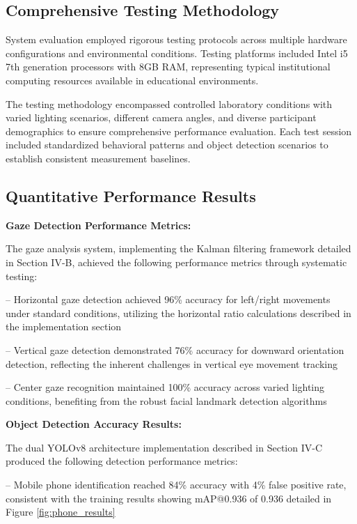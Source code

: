 \documentclass[conference]{IEEEtran}
\begin{document}
\subsection{Comprehensive Testing Methodology}

System evaluation employed rigorous testing protocols across multiple hardware configurations 
and environmental conditions. Testing platforms included Intel i5 7th generation processors 
with 8GB RAM, representing typical institutional computing resources available in educational 
environments.

The testing methodology encompassed controlled laboratory conditions with varied lighting 
scenarios, different camera angles, and diverse participant demographics to ensure 
comprehensive performance evaluation. Each test session included standardized behavioral 
patterns and object detection scenarios to establish consistent measurement baselines.

\subsection{Quantitative Performance Results}

\textbf{Gaze Detection Performance Metrics:}

The gaze analysis system, implementing the Kalman filtering framework detailed in Section IV-B, 
achieved the following performance metrics through systematic testing:

-- Horizontal gaze detection achieved 96\% accuracy for left/right movements under 
standard conditions, utilizing the horizontal ratio calculations described in the 
implementation section

-- Vertical gaze detection demonstrated 76\% accuracy for downward orientation 
detection, reflecting the inherent challenges in vertical eye movement tracking

-- Center gaze recognition maintained 100\% accuracy across varied lighting 
conditions, benefiting from the robust facial landmark detection algorithms

\textbf{Object Detection Accuracy Results:}

The dual YOLOv8 architecture implementation described in Section IV-C produced 
the following detection performance metrics:

-- Mobile phone identification reached 84\% accuracy with 4\% false positive rate, 
consistent with the training results showing mAP@0.936 of 0.936 detailed in Figure \ref{fig:phone_results}
\end{document}
